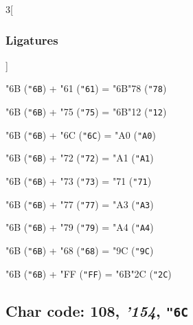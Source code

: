 \documentclass{article}
\newlength{\maxcharwidth}
\begin{document}
\begin{multicols}{3}[\subsubsection{Ligatures}]

{\testfont\char"6B\noboundary} ({\tt"6B}) + {\testfont\char"61\noboundary} ({\tt"61}) = {\testfont\char"6B\noboundary}{\testfont\char"78\noboundary} ({\tt"78}) 

{\testfont\char"6B\noboundary} ({\tt"6B}) + {\testfont\char"75\noboundary} ({\tt"75}) = {\testfont\char"6B\noboundary}{\testfont\char"12\noboundary} ({\tt"12}) 

{\testfont\char"6B\noboundary} ({\tt"6B}) + {\testfont\char"6C\noboundary} ({\tt"6C}) = {\testfont\char"A0\noboundary} ({\tt"A0}) 

{\testfont\char"6B\noboundary} ({\tt"6B}) + {\testfont\char"72\noboundary} ({\tt"72}) = {\testfont\char"A1\noboundary} ({\tt"A1}) 

{\testfont\char"6B\noboundary} ({\tt"6B}) + {\testfont\char"73\noboundary} ({\tt"73}) = {\testfont\char"71\noboundary} ({\tt"71}) 

{\testfont\char"6B\noboundary} ({\tt"6B}) + {\testfont\char"77\noboundary} ({\tt"77}) = {\testfont\char"A3\noboundary} ({\tt"A3}) 

{\testfont\char"6B\noboundary} ({\tt"6B}) + {\testfont\char"79\noboundary} ({\tt"79}) = {\testfont\char"A4\noboundary} ({\tt"A4}) 

{\testfont\char"6B\noboundary} ({\tt"6B}) + {\testfont\char"68\noboundary} ({\tt"68}) = {\testfont\char"9C\noboundary} ({\tt"9C}) 

{\testfont\char"6B\noboundary} ({\tt"6B}) + {\testfont\char"FF\noboundary} ({\tt"FF}) = {\testfont\char"6B\noboundary}{\testfont\char"2C\noboundary} ({\tt"2C}) 

\end{multicols}

\subsection{Char code: 108, {\it'154}, {\tt"6C}}
\label{char_108}

\end{document}
